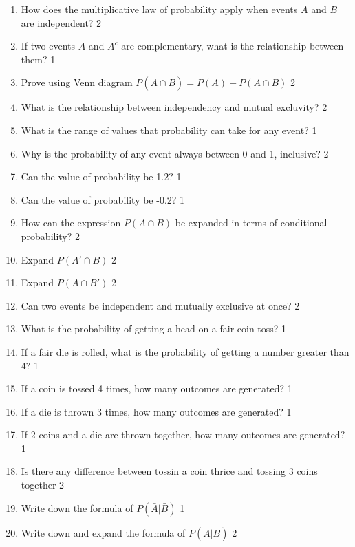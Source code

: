 \documentclass[a4paper,oneside]{book}
\begin{document}
\begin{enumerate}
\item How does the multiplicative law of probability apply when events \( A \) and \( B \) are independent? \hfill 2

\item If two events \( A \) and \( A^c \) are complementary, what is the relationship between them? \hfill 1

\item Prove using Venn diagram $P(A\cap \bar B) = P(A) - P(A\cap B)$ \hfill 2

 \item 	What is the relationship between independency and mutual excluvity? \hfill 2

\item What is the range of values that probability can take for any event? \hfill 1

\item Why is the probability of any event always between 0 and 1, inclusive? \hfill 2

\item Can the value of probability be 1.2? \hfill 1

\item Can the value of probability be -0.2? \hfill 1

\item How can the expression \( P(A \cap B) \) be expanded in terms of conditional probability? \hfill 2

\item Expand \( P(A' \cap B) \) \hfill 2

\item Expand \( P(A \cap B') \) \hfill 2

\item Can two events be independent and mutually exclusive at once? \hfill 2

\item What is the probability of getting a head on a fair coin toss? \hfill 1

\item If a fair die is rolled, what is the probability of getting a number greater than 4? \hfill 1

\item If a coin is tossed 4 times, how many outcomes are generated? \hfill 1

\item If a die is thrown 3 times, how many outcomes are generated? \hfill 1

\item If 2 coins and a die are thrown together, how many outcomes are generated? \hfill 1

\item Is there any difference between tossin a coin thrice and tossing 3 coins together \hfill 2

\item Write down the formula of $P(\bar A | \bar B)$ \hfill 1

\item Write down and expand the formula of $P(\bar A | B)$ \hfill 2


  \end{enumerate}
\end{document}

